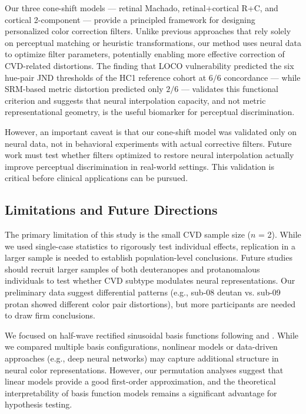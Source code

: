 Our three cone-shift models --- retinal Machado, retinal+cortical R+C, and cortical 2-component --- provide a principled framework for designing personalized color correction filters. Unlike previous approaches that rely solely on perceptual matching or heuristic transformations, our method uses neural data to optimize filter parameters, potentially enabling more effective correction of CVD-related distortions. The finding that LOCO vulnerability predicted the six hue-pair JND thresholds of the HC1 reference cohort at $6/6$ concordance --- while SRM-based metric distortion predicted only $2/6$ --- validates this functional criterion and suggests that neural interpolation capacity, and not metric representational geometry, is the useful biomarker for perceptual discrimination.

However, an important caveat is that our cone-shift model was validated only on neural data, not in behavioral experiments with actual corrective filters. Future work must test whether filters optimized to restore neural interpolation actually improve perceptual discrimination in real-world settings. This validation is critical before clinical applications can be pursued.

\subsection{Limitations and Future Directions}

The primary limitation of this study is the small CVD sample size ($n$ = 2). While we used single-case statistics \cite{crawford1998} to rigorously test individual effects, replication in a larger sample is needed to establish population-level conclusions. Future studies should recruit larger samples of both deuteranopes and protanomalous individuals to test whether CVD subtype modulates neural representations. Our preliminary data suggest differential patterns (e.g., sub-08 deutan vs. sub-09 protan showed different color pair distortions), but more participants are needed to draw firm conclusions.

We focused on half-wave rectified sinusoidal basis functions following \textcite{brouwer2009} and \textcite{brouwer2013}. While we compared multiple basis configurations, nonlinear models or data-driven approaches (e.g., deep neural networks) may capture additional structure in neural color representations. However, our permutation analyses suggest that linear models provide a good first-order approximation, and the theoretical interpretability of basis function models remains a significant advantage for hypothesis testing.

